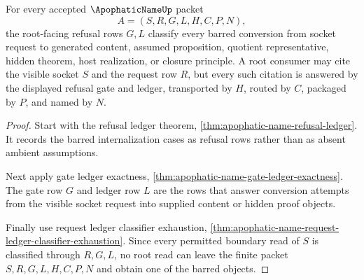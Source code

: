 \begin{theorem}
\label{thm:apophatic-name-root-refusal-ledger-exactness}
For every accepted $\ApophaticNameUp$ packet
$$
A=(S,R,G,L,H,C,P,N),
$$
the root-facing refusal rows $G,L$ classify every barred conversion from socket request to generated content, assumed proposition, quotient representative, hidden theorem, host realization, or closure principle. A root consumer may cite the visible socket $S$ and the request row $R$, but every such citation is answered by the displayed refusal gate and ledger, transported by $H$, routed by $C$, packaged by $P$, and named by $N$.
\end{theorem}
\begin{proof}
Start with the refusal ledger theorem, \autoref{thm:apophatic-name-refusal-ledger}. It records the barred internalization cases as refusal rows rather than as absent ambient assumptions.

Next apply gate ledger exactness, \autoref{thm:apophatic-name-gate-ledger-exactness}. The gate row $G$ and ledger row $L$ are the rows that answer conversion attempts from the visible socket request into supplied content or hidden proof objects.

Finally use request ledger classifier exhaustion, \autoref{thm:apophatic-name-request-ledger-classifier-exhaustion}. Since every permitted boundary read of $S$ is classified through $R,G,L$, no root read can leave the finite packet $S,R,G,L,H,C,P,N$ and obtain one of the barred objects.
\end{proof}

